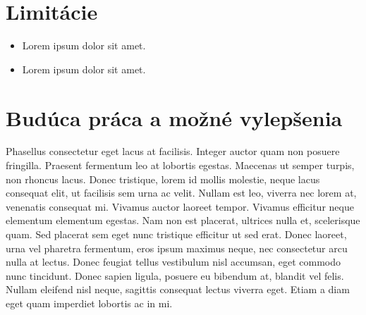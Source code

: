 \section{Limitácie}

\begin{itemize}
    \item Lorem ipsum dolor sit amet.
    \item Lorem ipsum dolor sit amet.
\end{itemize}

\section{Budúca práca a možné vylepšenia}

Phasellus consectetur eget lacus at facilisis. Integer auctor quam non posuere fringilla. Praesent fermentum leo at lobortis egestas. Maecenas ut semper turpis, non rhoncus lacus. Donec tristique, lorem id mollis molestie, neque lacus consequat elit, ut facilisis sem urna ac velit. Nullam est leo, viverra nec lorem at, venenatis consequat mi. Vivamus auctor laoreet tempor. Vivamus efficitur neque elementum elementum egestas. Nam non est placerat, ultrices nulla et, scelerisque quam. Sed placerat sem eget nunc tristique efficitur ut sed erat. Donec laoreet, urna vel pharetra fermentum, eros ipsum maximus neque, nec consectetur arcu nulla at lectus. Donec feugiat tellus vestibulum nisl accumsan, eget commodo nunc tincidunt. Donec sapien ligula, posuere eu bibendum at, blandit vel felis. Nullam eleifend nisl neque, sagittis consequat lectus viverra eget. Etiam a diam eget quam imperdiet lobortis ac in mi.